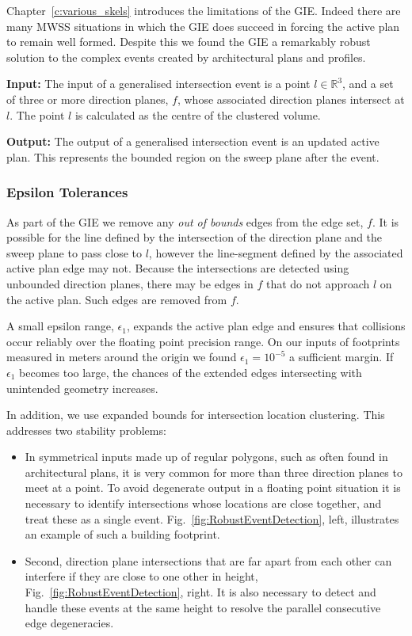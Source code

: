 Chapter~\ref{c:various_skels} introduces the limitations of the GIE. Indeed there are many MWSS situations in which the GIE does succeed in forcing the active plan to remain well formed. Despite this we found the GIE a remarkably robust solution to the complex events created by architectural plans and profiles. 

{\bf Input:} The input of a generalised intersection event is a point $l \in \mathbb{R}^3$, and a set of three or more direction planes, $f$, whose associated direction planes intersect at $l$. The point $l$ is calculated as the centre of the clustered volume.

{\bf Output:} The output of a generalised intersection event is an updated active plan. This represents the bounded region on the sweep plane after the event.

\subsubsection{Epsilon Tolerances} 

As part of the GIE we remove any \emph{out of bounds} edges from the edge set, $f$. It is possible for the line defined by the intersection of the direction plane and the sweep plane to pass close to $l$, however the line-segment defined by the associated active plan edge may not. Because the intersections are detected using unbounded direction planes, there may be edges in $f$ that do not approach $l$ on the active plan. Such edges are removed from $f$. 

A small epsilon range, $\epsilon_1$, expands the active plan edge and ensures that collisions occur reliably over the floating point precision range. On our inputs of footprints measured in meters around the origin we found  $\epsilon_1 = 10^{-5}$ a sufficient margin. If $\epsilon_1$ becomes too large, the chances of the extended edges intersecting with unintended geometry increases.

In addition, we use expanded bounds for intersection location clustering. This addresses two stability problems:
\begin{itemize}
\item{In symmetrical inputs made up of regular polygons, such as often found in architectural plans, it is very common for more than three direction planes to meet at a point. To avoid degenerate output in a floating point situation it is necessary to identify intersections whose locations are close together, and treat these as a single event. Fig.~\ref{fig:RobustEventDetection}, left, illustrates an example of such a building footprint.}
\item{Second, direction plane intersections that are far apart from each other can interfere if they are close to one other in height, Fig.~\ref{fig:RobustEventDetection}, right. It is also necessary to detect and handle these events at the same height to resolve the parallel consecutive edge degeneracies.}
\end{itemize}

